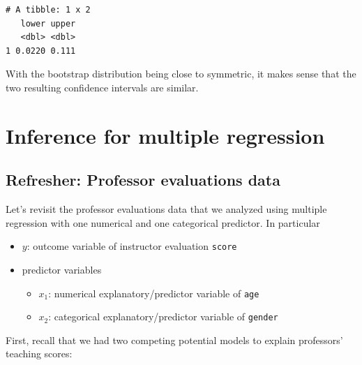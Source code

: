 \documentclass[12pt,]{krantz}
\makeatletter
\newenvironment{Shaded}{\begin{snugshade}}{\end{snugshade}}
\newcommand{\KeywordTok}[1]{\textcolor[rgb]{0.27,0.27,0.27}{\textbf{#1}}}
\newcommand{\StringTok}[1]{\textcolor[rgb]{0.5,0.5,0.5}{#1}}
\newcommand{\OperatorTok}[1]{\textcolor[rgb]{0.43,0.43,0.43}{\textbf{#1}}}
\newcommand{\NormalTok}[1]{#1}
\providecommand{\tightlist}{%
  \setlength{\itemsep}{0pt}\setlength{\parskip}{0pt}}
\newenvironment{kframe}{%
\medskip{}
\setlength{\fboxsep}{.8em}
 \def\at@end@of@kframe{}%
 \ifinner\ifhmode%
  \def\at@end@of@kframe{\end{minipage}}%
  \begin{minipage}{\columnwidth}%
 \fi\fi%
 \def\FrameCommand##1{\hskip\@totalleftmargin \hskip-\fboxsep
 \colorbox{shadecolor}{##1}\hskip-\fboxsep
     \hskip-\linewidth \hskip-\@totalleftmargin \hskip\columnwidth}%
 \MakeFramed {\advance\hsize-\width
   \@totalleftmargin\z@ \linewidth\hsize
   \@setminipage}}%
 {\par\unskip\endMakeFramed%
 \at@end@of@kframe}
\renewenvironment{Shaded}{\begin{kframe}}{\end{kframe}}
\makeatother
\begin{document}
\begin{verbatim}
# A tibble: 1 x 2
   lower upper
   <dbl> <dbl>
1 0.0220 0.111
\end{verbatim}

With the bootstrap distribution being close to symmetric, it makes sense
that the two resulting confidence intervals are similar.

\section{Inference for multiple
regression}\label{inference-for-multiple-regression}

\subsection{Refresher: Professor evaluations
data}\label{refresher-professor-evaluations-data}

Let's revisit the professor evaluations data that we analyzed using
multiple regression with one numerical and one categorical predictor. In
particular

\begin{itemize}
\tightlist
\item
  \(y\): outcome variable of instructor evaluation \texttt{score}
\item
  predictor variables

  \begin{itemize}
  \tightlist
  \item
    \(x_1\): numerical explanatory/predictor variable of \texttt{age}
  \item
    \(x_2\): categorical explanatory/predictor variable of
    \texttt{gender}
  \end{itemize}
\end{itemize}

\begin{Shaded}
\end{Shaded}

First, recall that we had two competing potential models to explain
professors' teaching scores:
\end{document}
